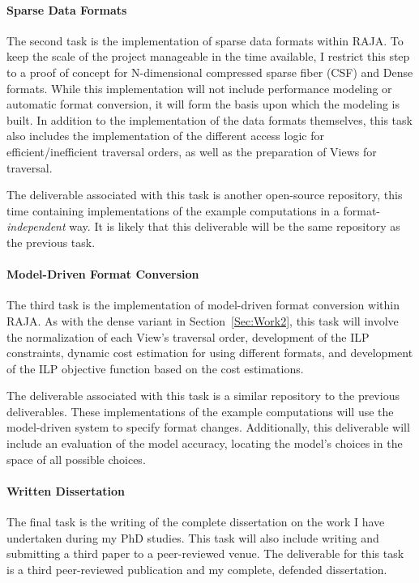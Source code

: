 \documentclass{article}
\begin{document}
\paragraph{Sparse Data Formats}
The second task is the implementation of sparse data formats within RAJA.
To keep the scale of the project manageable in the time available, I restrict this step to a proof of concept for N-dimensional compressed sparse fiber (CSF) and Dense formats.  
While this implementation will not include performance modeling or automatic format conversion, it will form the basis upon which the modeling is built.
In addition to the implementation of the data formats themselves, this task also includes the implementation of the different access logic for efficient/inefficient traversal orders, as well as the preparation of Views for traversal.

The deliverable associated with this task is another open-source repository, this time containing implementations of the example computations in a format-\textit{independent} way.
It is likely that this deliverable will be the same repository as the previous task.
\paragraph{Model-Driven Format Conversion}
The third task is the implementation of model-driven format conversion within RAJA. 
As with the dense variant in Section~\ref{Sec:Work2}, this task will involve the normalization of each View's traversal order, development of the ILP constraints, dynamic cost estimation for using different formats, and development of the ILP objective function based on the cost estimations.

The deliverable associated with this task is a similar repository to the previous deliverables.
These implementations of the example computations will use the model-driven system to specify format changes.
Additionally, this deliverable will include an evaluation of the model accuracy, locating the model's choices in the space of all possible choices.

\paragraph{Written Dissertation}
The final task is the writing of the complete dissertation on the work I have undertaken during my PhD studies.
This task will also include writing and submitting a third paper to a peer-reviewed venue.
The deliverable for this task is a third peer-reviewed publication and my complete, defended dissertation. 
\end{document}
